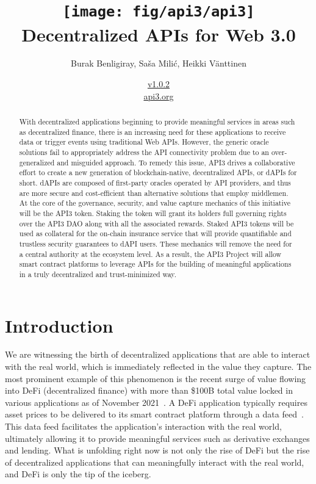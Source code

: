 \documentclass[11pt]{article}
\title{\texttt{[image: fig/api3/api3]} \\ Decentralized APIs for Web 3.0}
\author{Burak Benligiray, Sa\v{s}a Mili\'{c}, Heikki Vänttinen}
\date{\hyperref[sec:versions]{v1.0.2} \\ \medskip \href{https://api3.org}{api3.org}}
\begin{document}

\maketitle

\begin{abstract}
\noindent 
With decentralized applications beginning to provide meaningful services in areas such as decentralized finance, there is an increasing need for these applications to receive data or trigger events using traditional Web APIs.
However, the generic oracle solutions fail to appropriately address the API connectivity problem due to an over-generalized and misguided approach.
To remedy this issue, API3 drives a collaborative effort to create a new generation of blockchain-native, decentralized APIs, or dAPIs for short.
dAPIs are composed of first-party oracles operated by API providers, and thus are more secure and cost-efficient than alternative solutions that employ middlemen.
At the core of the governance, security, and value capture mechanics of this initiative will be the API3 token.
Staking the token will grant its holders full governing rights over the API3 DAO along with all the associated rewards.
Staked API3 tokens will be used as collateral for the on-chain insurance service that will provide quantifiable and trustless security guarantees to dAPI users.
These mechanics will remove the need for a central authority at the ecosystem level.
As a result, the API3 Project will allow smart contract platforms to leverage APIs for the building of meaningful applications in a truly decentralized and trust-minimized way.
\end{abstract}

\newpage
{}
\setcounter{page}{2}
\renewcommand{\contentsname}{} %
\tableofcontents


\newpage
{}
\setcounter{page}{1}

\section{Introduction}
\label{sec:introduction}

We are witnessing the birth of decentralized applications that are able to interact with the real world, which is immediately reflected in the value they capture.
The most prominent example of this phenomenon is the recent surge of value flowing into DeFi (decentralized finance) with more than \$100B total value locked in various applications as of November 2021~\cite{defipulse}.
A DeFi application typically requires asset prices to be delivered to its smart contract platform through a data feed~\cite{liu:2020}.
This data feed facilitates the application’s interaction with the real world, ultimately allowing it to provide meaningful services such as derivative exchanges and lending.
What is unfolding right now is not only the rise of DeFi but the rise of decentralized applications that can meaningfully interact with the real world, and DeFi is only the tip of the iceberg.
\end{document}
